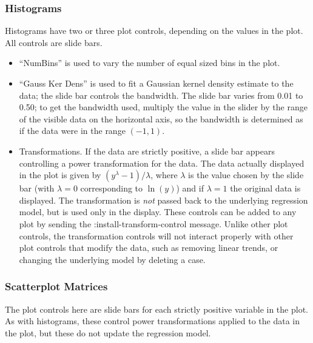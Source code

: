 \subsubsection{Histograms}
Histograms have two or three plot controls, depending on the values in the
plot.  All controls are slide bars.  
\begin{itemize}
\item ``NumBins'' is
used to vary the number of equal sized bins in the plot.  
\item ``Gauss Ker Dens'' is used to fit a Gaussian kernel density estimate 
to the data; the
slide bar controls the bandwidth.  The slide bar varies from 0.01 to 0.50; to
get the bandwidth used, multiply the value in the slider by the range of the
visible data on the horizontal axis, so the bandwidth is determined as if the
data were in the range $(-1, 1)$.
\item Transformations.  If the data are strictly
positive, a slide bar appears controlling a power transformation for the data.
The data actually displayed in the plot is given by $(y^\lambda
-1)/\lambda$, where $\lambda$ is the value chosen by the slide bar (with
$\lambda = 0$ corresponding to $\ln (y)$) and if $\lambda = 1$ the original
data is displayed.  The
transformation is {\sl not} passed back to the underlying regression model,
but is used only in the display.  These controls can be added to any plot by
sending the :install-transform-control message.  Unlike other plot controls,
the transformation controls will not interact properly with other plot
controls that modify the data, such as removing linear trends, or changing the
underlying model by deleting a case.
\end{itemize}
\subsubsection{Scatterplot Matrices}
The plot controls here are slide bars for each strictly positive variable
in the plot.  As with histograms, these control power transformations applied
to the data in the plot, but these do not update the regression model.  
